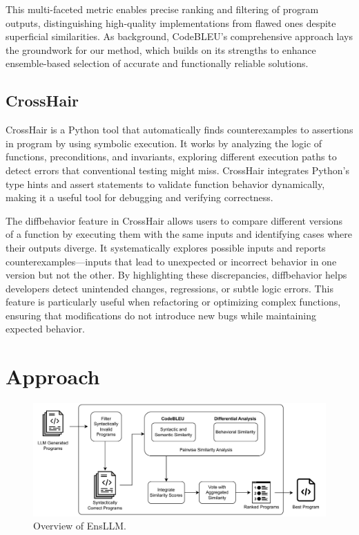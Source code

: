 \documentclass{article}
\newcommand{\tool}{EnsLLM}
\begin{document}
This multi-faceted metric enables precise ranking and filtering of program outputs, distinguishing high-quality implementations from flawed ones despite superficial similarities. As background, CodeBLEU’s comprehensive approach lays the groundwork for our method, which builds on its strengths to enhance ensemble-based selection of accurate and functionally reliable solutions.

\subsection{CrossHair}
CrossHair \cite{crosshair} is a Python tool that automatically finds counterexamples to assertions in program by using symbolic execution. It works by analyzing the logic of functions, preconditions, and invariants, exploring different execution paths to detect errors that conventional testing might miss. CrossHair integrates Python’s type hints and assert statements to validate function behavior dynamically, making it a useful tool for debugging and verifying correctness.

The diffbehavior feature in CrossHair allows users to compare different versions of a function by executing them with the same inputs and identifying cases where their outputs diverge. It systematically explores possible inputs and reports counterexamples—inputs that lead to unexpected or incorrect behavior in one version but not the other. By highlighting these discrepancies, diffbehavior helps developers detect unintended changes, regressions, or subtle logic errors. This feature is particularly useful when refactoring or optimizing complex functions, ensuring that modifications do not introduce new bugs while maintaining expected behavior.

\section{Approach}

\begin{figure}[t!]
    \centering
    \includegraphics[width=\linewidth]{figure/EnsembledLLM.pdf}
    \caption{Overview of \tool.}
    \label{fig:overview}
\end{figure}
\end{document}
